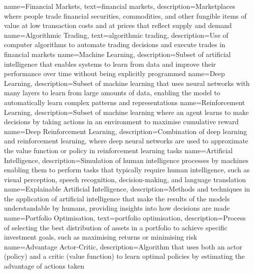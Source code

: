 {
    name=Financial Markets,
    text={financial markets},
    description={Marketplaces where people trade financial securities, commodities, and other fungible items of value at low transaction costs and at prices that reflect supply and demand}
}
{
    name=Algorithmic Trading,
    text={algorithmic trading},
    description={Use of computer algorithms to automate trading decisions and execute trades in financial markets}
}
{
    name=Machine Learning,
    description={Subset of artificial intelligence that enables systems to learn from data and improve their performance over time without being explicitly programmed}
}
{
    name=Deep Learning,
    description={Subset of machine learning that uses neural networks with many layers to learn from large amounts of data, enabling the model to automatically learn complex patterns and representations}
}
{
    name=Reinforcement Learning,
    description={Subset of machine learning where an agent learns to make decisions by taking actions in an environment to maximise cumulative reward}
}
{
    name=Deep Reinforcement Learning,
    description={Combination of deep learning and reinforcement learning, where deep neural networks are used to approximate the value function or policy in reinforcement learning tasks}
}
{
    name=Artificial Intelligence,
    description={Simulation of human intelligence processes by machines enabling them to perform tasks that typically require human intelligence, such as visual perception, speech recognition, decision-making, and language translation}
}
{
    name=Explainable Artificial Intelligence,
    description={Methods and techniques in the application of artificial intelligence that make the results of the models understandable by humans, providing insights into how decisions are made}
}
{
    name=Portfolio Optimisation,
    text={portfolio optimisation},
    description={Process of selecting the best distribution of assets in a portfolio to achieve specific investment goals, such as maximising returns or minimising risk}
}
{
    name=Advantage Actor-Critic,
    description={Algorithm that uses both an actor (policy) and a critic (value function) to learn optimal policies by estimating the advantage of actions taken}
}

